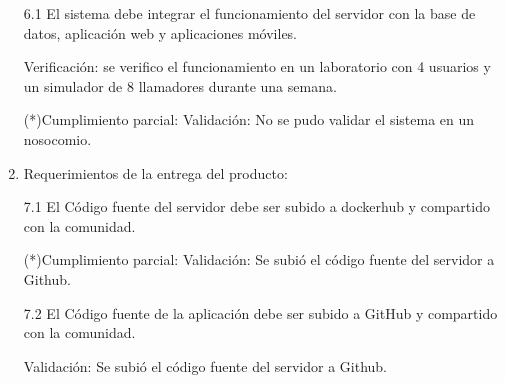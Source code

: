 \begin{enumerate}
6.1 El sistema debe integrar el funcionamiento del servidor con la base de datos, aplicación web y aplicaciones móviles.

Verificación: se verifico el funcionamiento en un laboratorio con 4 usuarios y un simulador de 8 llamadores durante una semana.

(*)Cumplimiento parcial:
Validación: No se pudo validar el sistema en un nosocomio.

\item Requerimientos de la entrega del producto:

7.1 El Código fuente del servidor debe ser subido a dockerhub y compartido con la comunidad.

(*)Cumplimiento parcial:
Validación: Se subió el código fuente del servidor a Github.

7.2 El Código fuente de la aplicación debe ser subido a GitHub y compartido con la comunidad.

Validación: Se subió el código fuente del servidor a Github.

\end{enumerate}
